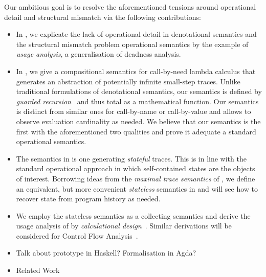 Our ambitious goal is to resolve the aforementioned tensions around operational
detail and structural mismatch via the following contributions:
\begin{itemize}
  \item In , we explicate the lack of operational detail in
    denotational semantics and the structural mismatch problem \wrt operational
    semantics by the example of \emph{usage analysis}, a generalisation of
    deadness analysis.
  \item In , we give a compositional semantics
    for call-by-need lambda calculus that generates an abstraction of
    potentially infinite small-step traces. Unlike traditional formulations
    of denotational semantics, our semantics is defined by \emph{guarded
    recursion}~\citep{gdtt} and thus total as a mathematical function.
    Our semantics is distinct from similar ones for call-by-name or
    call-by-value and allows to observe evaluation cardinality as needed.
    We believe that our semantics is the first with the aforementioned two
    qualities and prove it adequate \wrt a standard operational semantics.
  \item The semantics in  is one generating \emph{stateful}
    traces.
    This is in line with the standard operational approach in which
    self-contained states are the objects of interest.
    Borrowing ideas from the \emph{maximal trace semantics} of
    \citet{Cousot:21}, we define an equivalent, but more convenient
    \emph{stateless} semantics in  and will see how to
    recover state from program history as needed.
  \item We employ the stateless semantics as a collecting semantics and derive
    the usage analysis of  by \emph{calculational design}~\citep{Cousot:21}.
    Similar derivations will be considered for Control Flow Analysis~\citep{Shivers:91}.
  \item Talk about prototype in Haskell? Formalisation in Agda?
  \item Related Work 
\end{itemize}

